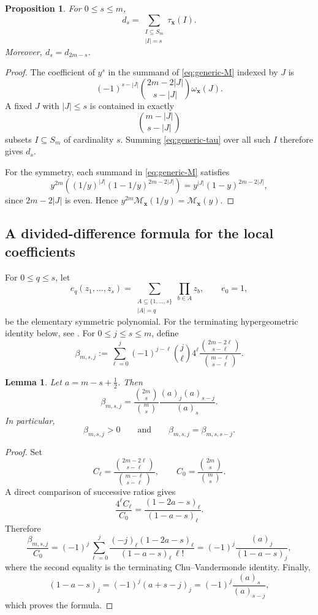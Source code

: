 \documentclass[12pt]{amsart}
\newtheorem{Lemma}[Theorem]{Lemma}
\newtheorem{Proposition}[Theorem]{Proposition}
\theoremstyle{definition}
\begin{document}
\begin{Proposition}\label{prop:generic-localization}
For $0\le s\le m$,
\[
d_s
=
\sum_{\substack{I\subseteq S_m\\|I|=s}}
\tau_{\mathbf x}(I).
\]
Moreover, $d_s=d_{2m-s}$.
\end{Proposition}

\begin{proof}
The coefficient of $y^s$ in the summand of \eqref{eq:generic-M} indexed by
$J$ is
\[
(-1)^{s-|J|}
\binom{2m-2|J|}{s-|J|}
\omega_{\mathbf x}(J).
\]
A fixed $J$ with $|J|\le s$ is contained in exactly
\[
\binom{m-|J|}{s-|J|}
\]
subsets $I\subseteq S_m$ of cardinality $s$.  Summing
\eqref{eq:generic-tau} over all such $I$ therefore gives $d_s$.

For the symmetry, each summand in \eqref{eq:generic-M} satisfies
\[
y^{2m}
\left(
(1/y)^{|J|}(1-1/y)^{2m-2|J|}
\right)
=
y^{|J|}(1-y)^{2m-2|J|},
\]
since $2m-2|J|$ is even.  
Hence $y^{2m}\mathcal M_{\mathbf x}(1/y)=\mathcal M_{\mathbf x}(y)$.
\end{proof}


\subsection{A divided-difference formula for the local coefficients}\label{sec:local-dd}

For $0\le q\le s$, let
\[
e_q(z_1,\ldots,z_s)
=
\sum_{\substack{A\subseteq\{1,\ldots,s\}\\|A|=q}}
\prod_{b\in A}z_b,
\qquad
e_0=1,
\]
be the elementary symmetric polynomial.  
For the terminating hypergeometric identity below, see
\cite[Chapter~2]{AndrewsAskeyRoy}.
For $0\le j\le s\le m$, define
\[
\beta_{m,s,j}
:=
\sum_{\ell=0}^j
(-1)^{j-\ell}\binom{j}{\ell}4^\ell
\frac{\binom{2m-2\ell}{s-\ell}}
{\binom{m-\ell}{s-\ell}}.
\]

\begin{Lemma}\label{lem:beta-identity}
Let $a=m-s+\frac12$.
Then
\[
\beta_{m,s,j}
=
\frac{\binom{2m}{s}}{\binom{m}{s}}
\frac{(a)_j(a)_{s-j}}{(a)_s}.
\]
In particular,
\[
\beta_{m,s,j}>0
\qquad\text{and}\qquad
\beta_{m,s,j}=\beta_{m,s,s-j}.
\]
\end{Lemma}

\begin{proof}
Set
\[
C_\ell
=
\frac{\binom{2m-2\ell}{s-\ell}}
{\binom{m-\ell}{s-\ell}},
\qquad
C_0=\frac{\binom{2m}{s}}{\binom{m}{s}}.
\]
A direct comparison of successive ratios gives
\[
\frac{4^\ell C_\ell}{C_0}
=
\frac{(1-2a-s)_\ell}{(1-a-s)_\ell}.
\]
Therefore
\[
\frac{\beta_{m,s,j}}{C_0}
=
(-1)^j
\sum_{\ell=0}^j
\frac{(-j)_\ell(1-2a-s)_\ell}
{(1-a-s)_\ell\,\ell!}
=
(-1)^j\frac{(a)_j}{(1-a-s)_j},
\]
where the second equality is the terminating Chu--Vandermonde identity.
Finally,
\[
(1-a-s)_j
=
(-1)^j(a+s-j)_j
=
(-1)^j\frac{(a)_s}{(a)_{s-j}},
\]
which proves the formula.
\end{proof}
\end{document}
